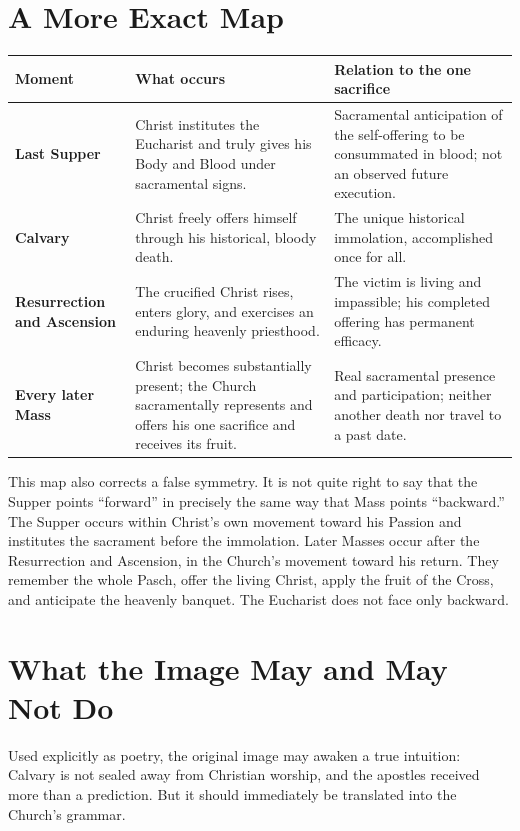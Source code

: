 \begin{deepstudy}
\section{A More Exact Map}

\begin{center}
\small
\begin{tabularx}{\textwidth}{@{}>{\bfseries}p{}XX@{}}
\toprule
Moment & What occurs & Relation to the one sacrifice \\
\midrule
Last Supper & Christ institutes the Eucharist and truly gives his Body and
Blood under sacramental signs. & Sacramental anticipation of the self-offering
to be consummated in blood; not an observed future execution. \\
Calvary & Christ freely offers himself through his historical, bloody death. &
The unique historical immolation, accomplished once for all. \\
Resurrection and Ascension & The crucified Christ rises, enters glory, and
exercises an enduring heavenly priesthood. & The victim is living and
impassible; his completed offering has permanent efficacy. \\
Every later Mass & Christ becomes substantially present; the Church
sacramentally represents and offers his one sacrifice and receives its fruit. &
Real sacramental presence and participation; neither another death nor travel
to a past date. \\
\bottomrule
\end{tabularx}
\end{center}

This map also corrects a false symmetry. It is not quite right to say that the
Supper points ``forward'' in precisely the same way that Mass points
``backward.'' The Supper occurs within Christ's own movement toward his Passion
and institutes the sacrament before the immolation. Later Masses occur after
the Resurrection and Ascension, in the Church's movement toward his return.
They remember the whole Pasch, offer the living Christ, apply the fruit of the
Cross, and anticipate the heavenly banquet. The Eucharist does not face only
backward.

\section{What the Image May and May Not Do}

Used explicitly as poetry, the original image may awaken a true intuition:
Calvary is not sealed away from Christian worship, and the apostles received
more than a prediction. But it should immediately be translated into the
Church's grammar.


\end{deepstudy}
